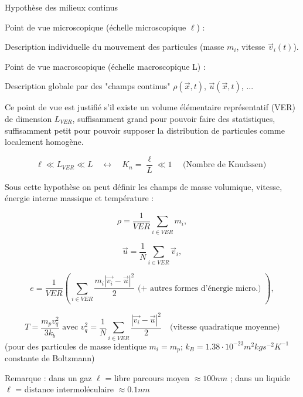 \begin{frame}{Hypothèse des milieux continus}

\small

Point de vue microscopique (échelle microscopique $\ell$) : 

Description individuelle du mouvement des particules (masse $m_i$, vitesse $\vec{v}_i(t)$).


\smallskip 
\pause

Point de vue macroscopique (échelle macroscopique L) : 

Description globale par des "champs continus" $\rho(\vec x,t)$, $\vec u(\vec x,t)$, ...


\smallskip 
\pause

Ce point de vue est justifié s'il existe un volume élémentaire représentatif (VER) de dimension $L_{VER}$, 
suffisamment grand pour pouvoir faire des statistiques, suffisamment petit pour pouvoir supposer la distribution de particules comme localement homogène.   

$$
\ell \ll L_{VER} \ll L  \quad \longleftrightarrow \quad K_n = \frac{\ell}{L} \ll 1 \quad \mbox{ (Nombre de Knudssen) }
$$

\smallskip 

\pause 

Sous cette hypothèse on peut définir les champs de masse volumique, vitesse, énergie interne massique et température :

$$
\rho = \frac{1}{VER} \sum_{i \in VER} m_i  ,
$$

$$
\vec{u} = \frac{1}{N} \sum_{i \in VER} \vec{v}_i  ,
$$


$$
e = \frac{1}{VER} \left(  \sum_{i \in VER} \frac{ m_i | \vec{v_i} - \vec{u} |^2}{2}  \mbox{ (+ autres formes d'énergie micro.) } \right) , 
$$


$$
T = \frac{ m_p v_q^2}{3 k_b}  \mbox{ avec } v_q^2  =  \frac{1}{N} \sum_{i \in VER} \frac{| \vec{v_i} - \vec{u}|^2}{2} \quad \mbox{(vitesse quadratique moyenne)}
$$
{\tiny 
(pour des particules de masse identique $m_i = m_p$; $k_B = 1.38 \cdot  10^{-23} m^2 kg s^{-2} K^{-1}$  constante de Boltzmann)
}

\pause
Remarque : dans un gaz $\ell$ =  libre parcours moyen $\approx 100 nm$ ; dans un liquide   $\ell$ =  distance intermoléculaire $\approx 0.1 nm$ 

\end{frame}


